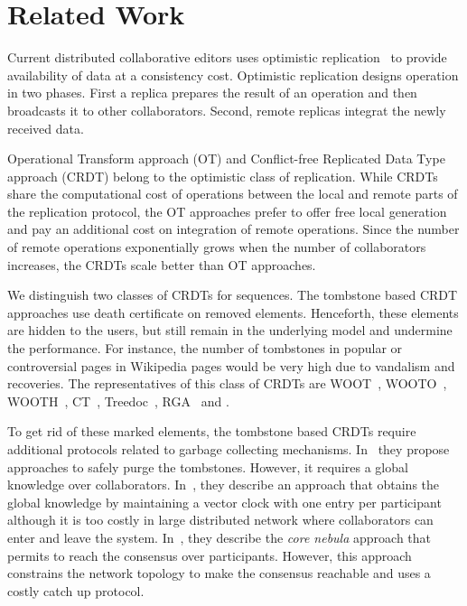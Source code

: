
\section{Related Work}
\label{sec:relatedwork}
Current distributed collaborative editors uses optimistic
replication~\cite{saito2002replication,saito2005optimistic} to provide
availability of data at a consistency cost. Optimistic replication designs
operation in two phases. First a replica prepares the result of an operation
and then broadcasts it to other collaborators. Second, remote replicas
integrat the newly received data.

Operational Transform approach (OT) and Conflict-free Replicated Data Type
approach (CRDT) belong to the optimistic class of replication. While CRDTs
share the computational cost of operations between the local and remote parts
of the replication protocol, the OT approaches prefer to offer free local
generation and pay an additional cost on integration of remote operations.
Since the number of remote operations exponentially grows when the number of
collaborators increases, the CRDTs scale better than OT approaches.


We distinguish two classes of CRDTs for sequences. The tombstone based CRDT
approaches use death certificate on removed elements. Henceforth, these
elements are hidden to the users, but still remain in the underlying model and
undermine the performance. For instance, the number of tombstones in popular or
controversial pages in Wikipedia pages would be very high due to vandalism and
recoveries. The representatives of this class of CRDTs are
WOOT~\cite{oster2006data}, WOOTO~\cite{weiss2007wooki},
WOOTH~\cite{ahmed2011evaluating}, CT~\cite{grishchenko2010deep},
Treedoc~\cite{preguica2009commutative}, RGA~\cite{roh2011replicated} and 
\cite{Yu2012stringwise}.

To get rid of these marked elements, the tombstone based CRDTs require
additional protocols related to garbage collecting
mechanisms. In~\cite{letia2009crdts,roh2011replicated} they propose approaches
to safely purge the tombstones. However, it requires a global knowledge over
collaborators.  In~\cite{roh2011replicated}, they describe an approach that
obtains the global knowledge by maintaining a vector clock with one entry per
participant although it is too costly in large distributed network where
collaborators can enter and leave the system. In~\cite{letia2009crdts}, they
describe the \emph{core nebula} approach that permits to reach the consensus
over participants. However, this approach constrains the network topology to
make the consensus reachable and uses a costly catch up protocol.


